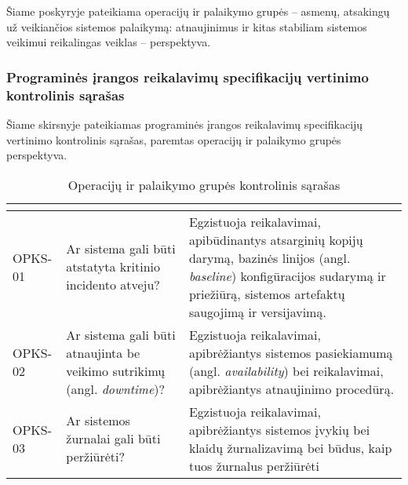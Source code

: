 \documentclass{VUMIFPSkursinis}
\begin{document}
Šiame poskyryje pateikiama operacijų ir palaikymo grupės -- asmenų, atsakingų už veikiančios
sistemos palaikymą: atnaujinimus ir kitas stabiliam sistemos veikimui reikalingas veiklas -- perspektyva.

\subsubsection{Programinės įrangos reikalavimų specifikacijų vertinimo kontrolinis sąrašas}

Šiame skirsnyje pateikiamas programinės įrangos reikalavimų specifikacijų vertinimo kontrolinis sąrašas,
paremtas operacijų ir palaikymo grupės perspektyva.

\begin{center}
	\small
	\begin{longtable}{|C{2cm}|L{5cm}|L{8cm}|}
		\caption{Operacijų ir palaikymo grupės kontrolinis sąrašas}
		\label{table:EmployeeSalary}
		\\ \hline
		                                                         &
		                                             &
		\\ \hline
		OPKS-01                                                                                                 &
		Ar sistema gali būti atstatyta kritinio incidento atveju?                                               &
		Egzistuoja reikalavimai, apibūdinantys atsarginių kopijų darymą, bazinės linijos (angl. \textit{baseline}) konfigūracijos sudarymą ir priežiūrą, sistemos artefaktų saugojimą ir versijavimą. \\ \hline
		OPKS-02                                                                                                 &
		Ar sistema gali būti atnaujinta be veikimo sutrikimų (angl. \textit{downtime})?                         &
		Egzistuoja reikalavimai, apibrėžiantys sistemos pasiekiamumą (angl. \textit{availability}) bei reikalavimai, apibrėžiantys atnaujinimo procedūrą.                                             \\ \hline
		OPKS-03                                                                                                 &
		Ar sistemos žurnalai gali būti peržiūrėti?                                                              &
		Egzistuoja reikalavimai, apibrėžiantys sistemos įvykių bei klaidų žurnalizavimą bei būdus, kaip tuos žurnalus peržiūrėti                                                                      \\ \hline

\end{longtable}
\end{center}
\end{document}
